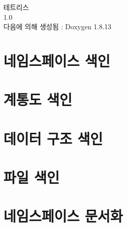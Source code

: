 \documentclass[twoside]{book}
\newcommand{\+}{\discretionary{\mbox{\scriptsize$\hookleftarrow$}}{}{}}
\newcommand{\clearemptydoublepage}{%
  \newpage{\pagestyle{empty}\cleardoublepage}%
}
\begin{document}
\hypersetup{pageanchor=false,
             bookmarksnumbered=true,
             pdfencoding=unicode
            }
\begin{titlepage}
\vspace*{7cm}
\begin{center}%
{\Large 테트리스 \\[1ex]\large 1.\+0 }\\
\vspace*{1cm}
{\large 다음에 의해 생성됨 \+:  Doxygen 1.8.13}\\
\end{center}
\end{titlepage}
\clearemptydoublepage
{}
\tableofcontents
\clearemptydoublepage
{}
\hypersetup{pageanchor=true}

\chapter{네임스페이스 색인}

\chapter{계통도 색인}

\chapter{데이터 구조 색인}

\chapter{파일 색인}

\chapter{네임스페이스 문서화}

















\end{document}
